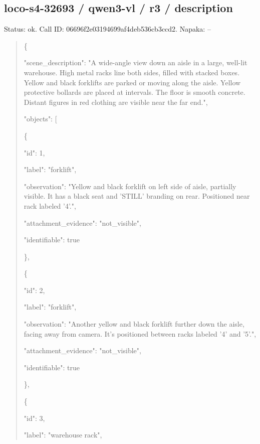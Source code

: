 \documentclass[10pt,a4paper]{article}
\begin{document}
\subsection*{loco-s4-32693 / qwen3-vl / r3 / description}
Status: ok. Call ID: 06696f2e03194699af4deb536cb3ccd2. Napaka: --
\begin{quote}\footnotesize
\{\par
  "scene\_description":\allowbreak{} "A wide-angle view down an aisle in a large,\allowbreak{} well-lit warehouse. High metal racks line both sides,\allowbreak{} filled with stacked boxes. Yellow and black forklifts are parked or moving along the aisle. Yellow protective bollards are placed at intervals. The floor is smooth concrete. Distant figures in red clothing are visible near the far end.",\allowbreak{}\par
  "objects":\allowbreak{} [\par
    \{\par
      "id":\allowbreak{} 1,\allowbreak{}\par
      "label":\allowbreak{} "forklift",\allowbreak{}\par
      "observation":\allowbreak{} "Yellow and black forklift on left side of aisle,\allowbreak{} partially visible. It has a black seat and 'STILL' branding on rear. Positioned near rack labeled '4'.",\allowbreak{}\par
      "attachment\_evidence":\allowbreak{} "not\_visible",\allowbreak{}\par
      "identifiable":\allowbreak{} true\par
    \},\allowbreak{}\par
    \{\par
      "id":\allowbreak{} 2,\allowbreak{}\par
      "label":\allowbreak{} "forklift",\allowbreak{}\par
      "observation":\allowbreak{} "Another yellow and black forklift further down the aisle,\allowbreak{} facing away from camera. It's positioned between racks labeled '4' and '5'.",\allowbreak{}\par
      "attachment\_evidence":\allowbreak{} "not\_visible",\allowbreak{}\par
      "identifiable":\allowbreak{} true\par
    \},\allowbreak{}\par
    \{\par
      "id":\allowbreak{} 3,\allowbreak{}\par
      "label":\allowbreak{} "warehouse rack",\allowbreak{}\par

\end{quote}
\end{document}
